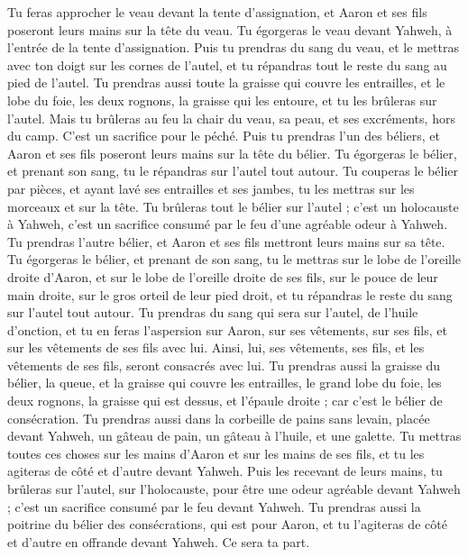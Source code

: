 \begin{multicols}{2}
Tu feras approcher le veau devant la tente d'assignation, et Aaron et ses fils poseront leurs mains sur la tête du veau.
Tu égorgeras le veau devant Yahweh, à l'entrée de la tente d'assignation.
Puis tu prendras du sang du veau, et le mettras avec ton doigt sur les cornes de l'autel, et tu répandras tout le reste du sang au pied de l'autel.
Tu prendras aussi toute la graisse qui couvre les entrailles, et le lobe du foie, les deux rognons, la graisse qui les entoure, et tu les brûleras sur l'autel.
Mais tu brûleras au feu la chair du veau, sa peau, et ses excréments, hors du camp. C'est un sacrifice pour le péché\FTNT{}.
Puis tu prendras l'un des béliers, et Aaron et ses fils poseront leurs mains sur la tête du bélier.
Tu égorgeras le bélier, et prenant son sang, tu le répandras sur l'autel tout autour.
Tu couperas le bélier par pièces, et ayant lavé ses entrailles et ses jambes, tu les mettras sur les morceaux et sur la tête.
Tu brûleras tout le bélier sur l'autel ; c'est un holocauste à Yahweh, c’est un sacrifice consumé par le feu d’une agréable odeur à Yahweh.
Tu prendras l'autre bélier, et Aaron et ses fils mettront leurs mains sur sa tête.
Tu égorgeras le bélier, et prenant de son sang, tu le mettras sur le lobe de l'oreille droite d'Aaron, et sur le lobe de l'oreille droite de ses fils, sur le pouce de leur main droite, sur le gros orteil de leur pied droit, et tu répandras le reste du sang sur l'autel tout autour.
Tu prendras du sang qui sera sur l'autel, de l'huile d'onction, et tu en feras l’aspersion sur Aaron, sur ses vêtements, sur ses fils, et sur les vêtements de ses fils avec lui. Ainsi, lui, ses vêtements, ses fils, et les vêtements de ses fils, seront consacrés avec lui.
Tu prendras aussi la graisse du bélier, la queue, et la graisse qui couvre les entrailles, le grand lobe du foie, les deux rognons, la graisse qui est dessus, et l'épaule droite ; car c'est le bélier de consécration.
Tu prendras aussi dans la corbeille de pains sans levain, placée devant Yahweh, un gâteau de pain, un gâteau à l'huile, et une galette.
Tu mettras toutes ces choses sur les mains d’Aaron et sur les mains de ses fils, et tu les agiteras de côté et d’autre devant Yahweh\FTNT{}.
Puis les recevant de leurs mains, tu brûleras sur l'autel, sur l'holocauste, pour être une odeur agréable devant Yahweh ; c'est un sacrifice consumé par le feu devant Yahweh.
Tu prendras aussi la poitrine du bélier des consécrations, qui est pour Aaron, et tu l’agiteras de côté et d’autre en offrande devant Yahweh. Ce sera ta part.

\end{multicols}
